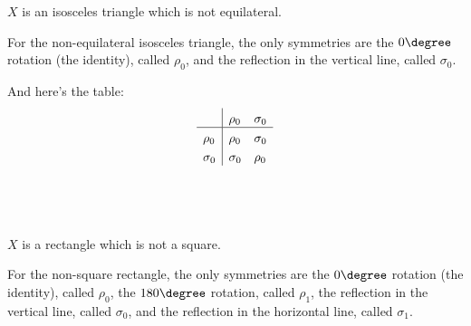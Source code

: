 \documentclass[a4paper]{article}
\begin{document}
\begin{questionbody}
$X$ is an isosceles triangle which is not equilateral.
\end{questionbody}

For the non-equilateral isosceles triangle, the only symmetries are the $0\degree$ rotation (the identity), called $\rho_0$, and the reflection in the vertical line, called $\sigma_0$.

\begin{center}
\end{center}

And here's the table:
\[
\setlength{\extrarowheight}{3pt}%
\begin{array}{l|*{2}{l}} %
    & \rho_0 & \sigma_0 \\
\hline %
\rho_0 & \rho_0 & \sigma_0 \\
\sigma_0 & \sigma_0 & \rho_0 \\
\end{array}
\]

\subsection{~} %

\begin{questionbody}
$X$ is a rectangle which is not a square.
\end{questionbody}

For the non-square rectangle, the only symmetries are the $0\degree$ rotation (the identity), called $\rho_0$, the $180\degree$ rotation, called $\rho_1$, the reflection in the vertical line, called $\sigma_0$, and the reflection in the horizontal line, called $\sigma_1$.

\begin{center}
\end{center}
\end{document}
